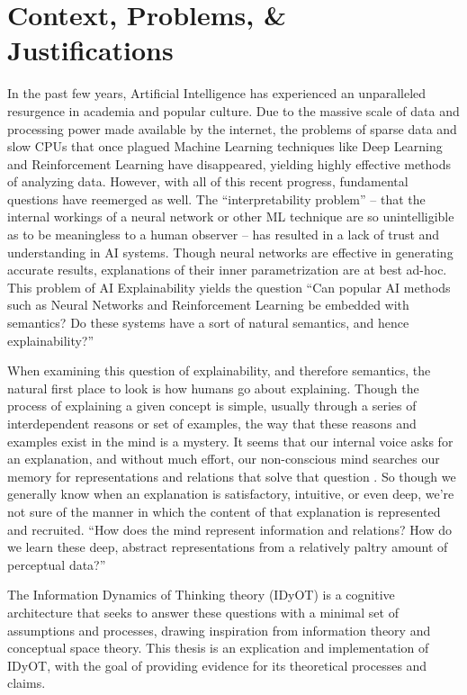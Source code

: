 \section{Context, Problems, \& Justifications}
\label{section:context-problems-justifications}

In the past few years, Artificial Intelligence has experienced an unparalleled resurgence in academia and popular culture. Due to the massive scale of data and processing power made available by the internet, the problems of sparse data and slow CPUs that once plagued Machine Learning techniques like Deep Learning \citep{lecun2015deep} and Reinforcement Learning \citep{sutton1998introduction} have disappeared, yielding highly effective methods of analyzing data. However, with all of this recent progress, fundamental questions have reemerged as well. The “interpretability problem” \citep{chalmers1996conscious} – that the internal workings of a neural network or other ML technique are so unintelligible as to be meaningless to a human observer – has resulted in a lack of trust and understanding in AI systems. Though neural networks are effective in generating accurate results, explanations of their inner parametrization are at best ad-hoc. This problem of AI Explainability yields the question “Can popular AI methods such as Neural Networks and Reinforcement Learning be embedded with semantics? Do these systems have a sort of natural semantics, and hence explainability?”

When examining this question of explainability, and therefore semantics, the natural first place to look is how humans go about explaining. Though the process of explaining a given concept is simple, usually through a series of interdependent reasons or set of examples, the way that these reasons and examples exist in the mind is a mystery. It seems that our internal voice asks for an explanation, and without much effort, our non-conscious mind searches our memory for
representations and relations that solve that question \citep{baars1993cognitive}. So though we generally know when an explanation is satisfactory, intuitive, or even deep, we’re not sure of the manner in which the content of that explanation is represented and recruited. “How does the mind represent information and relations? How do we learn these deep, abstract representations from a relatively paltry amount of perceptual data?”

The Information Dynamics of Thinking theory (IDyOT) \citep{wiggins2018creativity} is a cognitive architecture that seeks to answer these questions with a minimal set of assumptions and processes, drawing inspiration from information theory and conceptual space theory.  This thesis is an explication and implementation of IDyOT, with the goal of providing evidence for its theoretical processes and claims.


